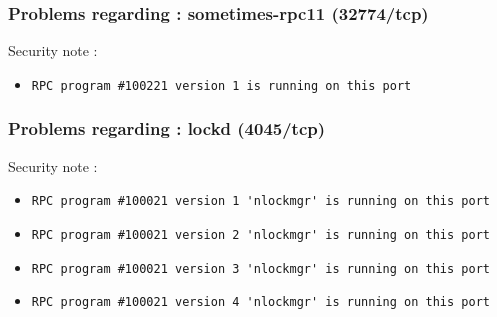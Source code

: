\documentclass{article}
\begin{document}
\subsubsection{Problems regarding : sometimes-rpc11 (32774/tcp)}
Security note :\\
\begin{itemize}
\item \begin{verbatim}
RPC program #100221 version 1 is running on this port
\end{verbatim}\end{itemize}
\subsubsection{Problems regarding : lockd (4045/tcp)}
Security note :\\
\begin{itemize}
\item \begin{verbatim}
RPC program #100021 version 1 'nlockmgr' is running on this port
\end{verbatim}\item \begin{verbatim}
RPC program #100021 version 2 'nlockmgr' is running on this port
\end{verbatim}\item \begin{verbatim}
RPC program #100021 version 3 'nlockmgr' is running on this port
\end{verbatim}\item \begin{verbatim}
RPC program #100021 version 4 'nlockmgr' is running on this port
\end{verbatim}\end{itemize}
\end{document}
